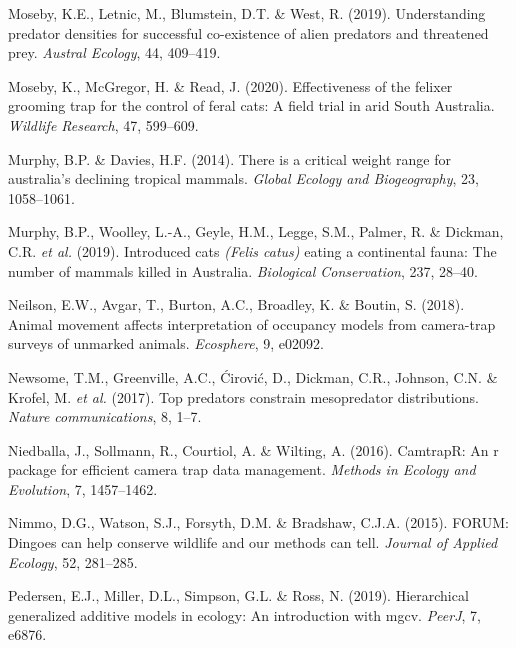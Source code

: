 \documentclass[11pt,a4paper,titlepage,twoside,openright]{style/unimelbthesis}
\begin{document}
\begin{mainmatter}
\leavevmode\hypertarget{ref-moseby2019understanding}{}%
Moseby, K.E., Letnic, M., Blumstein, D.T. \& West, R. (2019). Understanding predator densities for successful co-existence of alien predators and threatened prey. \emph{Austral Ecology}, 44, 409--419.

\leavevmode\hypertarget{ref-moseby2020effectiveness}{}%
Moseby, K., McGregor, H. \& Read, J. (2020). Effectiveness of the felixer grooming trap for the control of feral cats: A field trial in arid South Australia. \emph{Wildlife Research}, 47, 599--609.

\leavevmode\hypertarget{ref-murphy2014critical}{}%
Murphy, B.P. \& Davies, H.F. (2014). There is a critical weight range for australia's declining tropical mammals. \emph{Global Ecology and Biogeography}, 23, 1058--1061.

\leavevmode\hypertarget{ref-murphy2019introduced}{}%
Murphy, B.P., Woolley, L.-A., Geyle, H.M., Legge, S.M., Palmer, R. \& Dickman, C.R. \emph{et al.} (2019). Introduced cats \emph{(Felis catus)} eating a continental fauna: The number of mammals killed in Australia. \emph{Biological Conservation}, 237, 28--40.

\leavevmode\hypertarget{ref-neilson2018animal}{}%
Neilson, E.W., Avgar, T., Burton, A.C., Broadley, K. \& Boutin, S. (2018). Animal movement affects interpretation of occupancy models from camera-trap surveys of unmarked animals. \emph{Ecosphere}, 9, e02092.

\leavevmode\hypertarget{ref-newsome2017top}{}%
Newsome, T.M., Greenville, A.C., Ćirović, D., Dickman, C.R., Johnson, C.N. \& Krofel, M. \emph{et al.} (2017). Top predators constrain mesopredator distributions. \emph{Nature communications}, 8, 1--7.

\leavevmode\hypertarget{ref-niedballa2016}{}%
Niedballa, J., Sollmann, R., Courtiol, A. \& Wilting, A. (2016). CamtrapR: An r package for efficient camera trap data management. \emph{Methods in Ecology and Evolution}, 7, 1457--1462.

\leavevmode\hypertarget{ref-nimmo2015dingoes}{}%
Nimmo, D.G., Watson, S.J., Forsyth, D.M. \& Bradshaw, C.J.A. (2015). FORUM: Dingoes can help conserve wildlife and our methods can tell. \emph{Journal of Applied Ecology}, 52, 281--285.

\leavevmode\hypertarget{ref-pedersen2019hierarchical}{}%
Pedersen, E.J., Miller, D.L., Simpson, G.L. \& Ross, N. (2019). Hierarchical generalized additive models in ecology: An introduction with mgcv. \emph{PeerJ}, 7, e6876.


\end{mainmatter}
\end{document}

